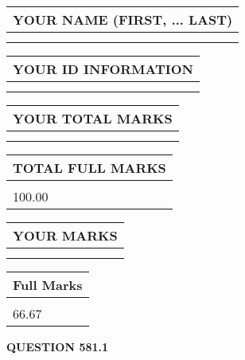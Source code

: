 \documentclass{ctexart}
\begin{document}
   
   
   
\newpage 
\setcounter{page}{ 
   581001 } 
   
   
   
   
\noindent\begin{tabular}{|l|}
\hline
YOUR NAME (FIRST, ... LAST)  \\
\hline
 \\ 
 \\ 
\hline
\end{tabular}
\hspace{0.05in} \begin{tabular}{|l|}
\hline
 YOUR   ID   INFORMATION  \\
\hline
 \\ 
 \\ 
\hline
\end{tabular}
   
   
\vspace{0.2in}\noindent\begin{tabular}{|l|}
\hline
YOUR TOTAL MARKS  \\
\hline
 \\ 
 \\ 
\hline
\end{tabular}
\hspace{0.05in} \begin{tabular}{|l|}
\hline
TOTAL FULL MARKS  \\
\hline
 \\ 
100.00 \\
\hline
\end{tabular}
   
   
 \vspace{0.2in}
 
 
 
 
   
   
  
\vspace{0.2in}
  
\noindent\begin{tabular}{|l|}
\hline
 YOUR MARKS  \\
\hline
 \\ 
 \\ 
\hline
\end{tabular}
\hspace{0.05in} \begin{tabular}{|l|}
\hline
 Full Marks  \\
\hline
 \\ 
66.67 \\
\hline
\end{tabular}
{\textbf{\Large{QUESTION
581.1 
}}}
  
\end{document}

